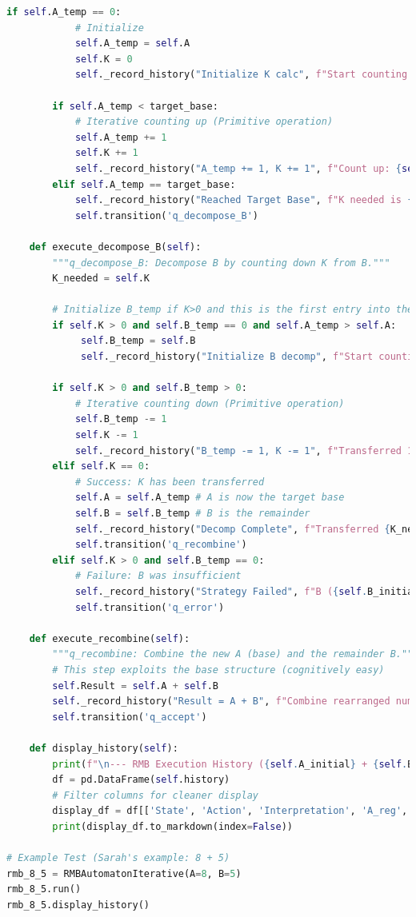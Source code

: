 \documentclass[11pt]{article}
\begin{document}
\begin{lstlisting}[language=Python]
        if self.A_temp == 0:
            # Initialize
            self.A_temp = self.A
            self.K = 0
            self._record_history("Initialize K calc", f"Start counting up from A ({self.A}) to Target Base ({target_base}).")

        if self.A_temp < target_base:
            # Iterative counting up (Primitive operation)
            self.A_temp += 1
            self.K += 1
            self._record_history("A_temp += 1, K += 1", f"Count up: {self.A_temp}. Distance (K): {self.K}.")
        elif self.A_temp == target_base:
            self._record_history("Reached Target Base", f"K needed is {self.K}.")
            self.transition('q_decompose_B')

    def execute_decompose_B(self):
        """q_decompose_B: Decompose B by counting down K from B."""
        K_needed = self.K

        # Initialize B_temp if K>0 and this is the first entry into the state (A_temp > A)
        if self.K > 0 and self.B_temp == 0 and self.A_temp > self.A:
             self.B_temp = self.B
             self._record_history("Initialize B decomp", f"Start counting down K ({self.K}) from B ({self.B}).")

        if self.K > 0 and self.B_temp > 0:
            # Iterative counting down (Primitive operation)
            self.B_temp -= 1
            self.K -= 1
            self._record_history("B_temp -= 1, K -= 1", f"Transferred 1. B remainder: {self.B_temp}. K remaining: {self.K}.")
        elif self.K == 0:
            # Success: K has been transferred
            self.A = self.A_temp # A is now the target base
            self.B = self.B_temp # B is the remainder
            self._record_history("Decomp Complete", f"Transferred {K_needed}. New state: A={self.A}, B={self.B}.")
            self.transition('q_recombine')
        elif self.K > 0 and self.B_temp == 0:
            # Failure: B was insufficient
            self._record_history("Strategy Failed", f"B ({self.B_initial}) is too small to provide K ({K_needed}).")
            self.transition('q_error')

    def execute_recombine(self):
        """q_recombine: Combine the new A (base) and the remainder B."""
        # This step exploits the base structure (cognitively easy)
        self.Result = self.A + self.B
        self._record_history("Result = A + B", f"Combine rearranged numbers: {self.A} + {self.B} = {self.Result}.")
        self.transition('q_accept')

    def display_history(self):
        print(f"\n--- RMB Execution History ({self.A_initial} + {self.B_initial}) ---")
        df = pd.DataFrame(self.history)
        # Filter columns for cleaner display
        display_df = df[['State', 'Action', 'Interpretation', 'A_reg', 'B_reg', 'K_reg', 'A_temp', 'B_temp']]
        print(display_df.to_markdown(index=False))

# Example Test (Sarah's example: 8 + 5)
rmb_8_5 = RMBAutomatonIterative(A=8, B=5)
rmb_8_5.run()
rmb_8_5.display_history()
\end{lstlisting}
\end{document}
